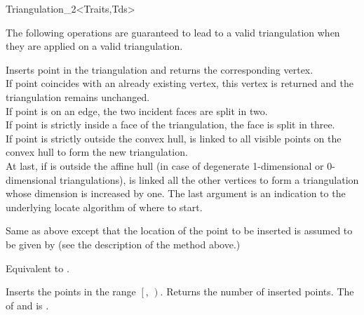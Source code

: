 \begin{ccClassTemplate}{Triangulation_2<Traits,Tds>}

The following operations are guaranteed to lead to a valid triangulation 
when they are applied on a valid triangulation.




{Inserts point  in the triangulation and returns the corresponding
 vertex.\\
If point  coincides with an already existing vertex, this 
vertex is returned and the triangulation remains unchanged.\\
If point  is on an edge, the two incident faces are split 
in two.\\
If point  is strictly inside a face of the triangulation,
the face is split in three.\\
If point  is strictly outside the  convex hull,  is linked
to all visible points on the convex hull to form the new
triangulation.\\
At last, if  is outside the affine hull (in case of degenerate
1-dimensional or 0-dimensional triangulations), 
is linked all the  other vertices to form a triangulation whose
dimension is increased by one.
The last argument  is an indication to the underlying locate
algorithm of where to start.
}


{Same as above except that the location of the point
  to be inserted is assumed to be given by
 (see the description of the  method above.)}

{Equivalent to .}

{Inserts the points in the range
 $\left[\right.$, $\left.\right)$.
 Returns the number of inserted points.
 \ccPrecond The  of  and 
 is .}


\end{ccClassTemplate}
